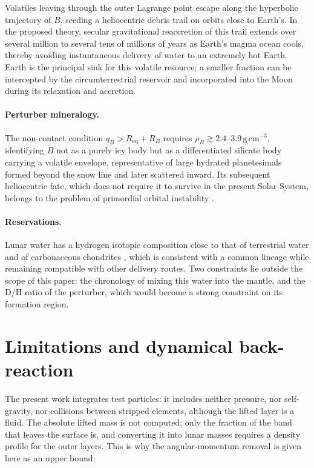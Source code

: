 \documentclass[11pt,a4paper]{article}
\begin{document}
Volatiles leaving through the outer Lagrange point escape along the hyperbolic trajectory of $B$, seeding a heliocentric debris trail on orbits close to Earth's. In the proposed theory, secular gravitational reaccretion of this trail extends over several million to several tens of millions of years as Earth's magma ocean cools, thereby avoiding instantaneous delivery of water to an extremely hot Earth. Earth is the principal sink for this volatile resource; a smaller fraction can be intercepted by the circumterrestrial reservoir and incorporated into the Moon during its relaxation and accretion.

\paragraph{Perturber mineralogy.}
The non-contact condition $q_B>R_{\mathrm{eq}}+R_B$ requires $\rho_B\gtrsim2.4$--$3.9\,\mathrm{g\,cm^{-3}}$, identifying $B$ not as a purely icy body but as a differentiated silicate body carrying a volatile envelope, representative of large hydrated planetesimals formed beyond the snow line and later scattered inward. Its subsequent heliocentric fate, which does not require it to survive in the present Solar System, belongs to the problem of primordial orbital instability \cite{Nesvorny2011}.

\paragraph{Reservations.}
Lunar water has a hydrogen isotopic composition close to that of terrestrial water and of carbonaceous chondrites \cite{Saal2008, Saal2013}, which is consistent with a common lineage while remaining compatible with other delivery routes. Two constraints lie outside the scope of this paper: the chronology of mixing this water into the mantle, and the D/H ratio of the perturber, which would become a strong constraint on its formation region.

\section{Limitations and dynamical back-reaction}

The present work integrates test particles: it includes neither pressure, nor self-gravity, nor collisions between stripped elements, although the lifted layer is a fluid. The absolute lifted mass is not computed; only the fraction of the band that leaves the surface is, and converting it into lunar masses requires a density profile for the outer layers. This is why the angular-momentum removal is given here as an upper bound.
\end{document}
